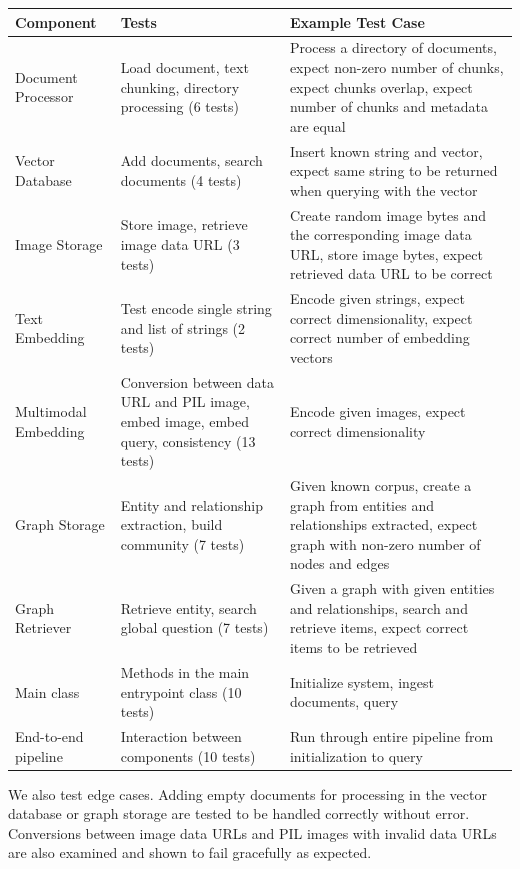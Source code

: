 \begin{tabularx}{\textwidth}{@{} l >{\raggedright\arraybackslash}X >{\raggedright\arraybackslash}X @{}}
    \toprule
    \textbf{Component} & \textbf{Tests} & \textbf{Example Test Case} \\
    \midrule
    \endhead
    Document Processor & Load document, text chunking, directory processing (6 tests)
        & Process a directory of documents, expect non-zero number of chunks, expect chunks overlap, expect number of chunks and metadata are equal \\
    Vector Database & Add documents, search documents (4 tests)
        & Insert known string and vector, expect same string to be returned when querying with the vector \\
    Image Storage & Store image, retrieve image data URL (3 tests)
        & Create random image bytes and the corresponding image data URL, store image bytes, expect retrieved data URL to be correct \\
    Text Embedding & Test encode single string and list of strings (2 tests)
        & Encode given strings, expect correct dimensionality, expect correct number of embedding vectors \\
    Multimodal Embedding & Conversion between data URL and PIL image, embed image, embed query, consistency (13 tests)
        & Encode given images, expect correct dimensionality \\
    Graph Storage & Entity and relationship extraction, build community (7 tests)
        & Given known corpus, create a graph from entities and relationships extracted, expect graph with non-zero number of nodes and edges \\
    Graph Retriever & Retrieve entity, search global question (7 tests)
        & Given a graph with given entities and relationships, search and retrieve items, expect correct items to be retrieved \\
    Main class & Methods in the main entrypoint class (10 tests)
        & Initialize system, ingest documents, query \\
    End-to-end pipeline & Interaction between components (10 tests)
        & Run through entire pipeline from initialization to query \\
    \bottomrule
\end{tabularx}

We also test edge cases.
Adding empty documents for processing in the vector database or graph storage are tested to be handled correctly without error.
Conversions between image data URLs and PIL images with invalid data URLs are also examined and shown to fail gracefully as expected. 


